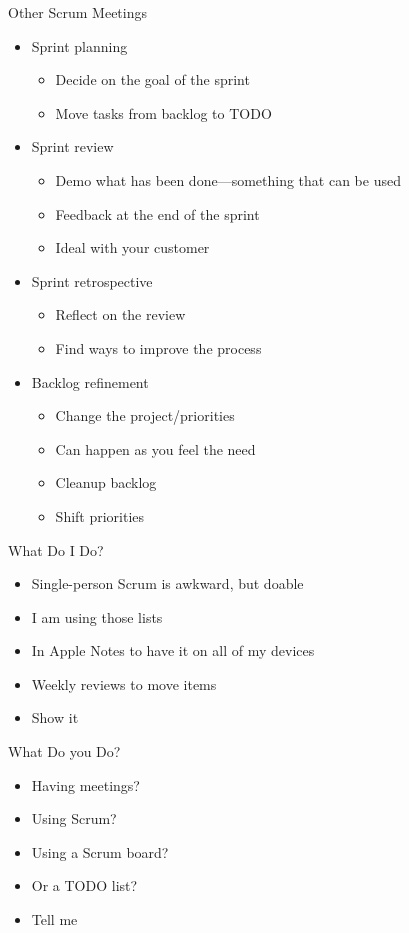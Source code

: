 \begin{frame}[fragile]{Other Scrum Meetings}
\begin{itemize}
\item Sprint planning
\begin{itemize}
\item Decide on the goal of the sprint
\item Move tasks from backlog to TODO
\end{itemize}
\item Sprint review
\begin{itemize}
\item Demo what has been done---something that can be used
\item Feedback at the end of the sprint
\item Ideal with your customer
\end{itemize}
\item Sprint retrospective
\begin{itemize}
\item Reflect on the review
\item Find ways to improve the process
\end{itemize}
\item Backlog refinement
\begin{itemize}
\item Change the project/priorities
\item Can happen as you feel the need
\item Cleanup backlog
\item Shift priorities
\end{itemize}
\end{itemize}
\end{frame}

\begin{frame}[fragile]{What Do I Do?}
\begin{itemize}
\item Single-person Scrum is awkward, but doable
\item I am using those lists
\item In Apple Notes to have it on all of my devices
\item Weekly reviews to move items
\item Show it
\end{itemize}
\end{frame}

\begin{frame}[fragile]{What Do you Do?}
\begin{itemize}
\item Having meetings?
\item Using Scrum?
\item Using a Scrum board?
\item Or a TODO list?
\item Tell me
\end{itemize}
\end{frame}


